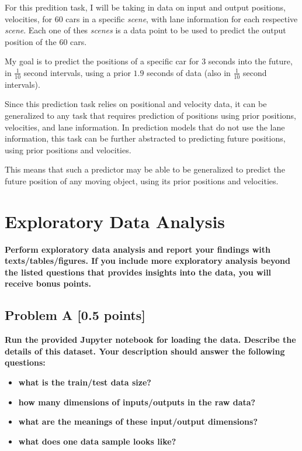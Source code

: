 \documentclass{article}
\begin{document}
      For this predition task, I will be taking in data on input and output positions, velocities, for $60$ cars in 
      a specific \emph{scene}, with lane information for each respective \emph{scene}. Each one of thes \emph{scenes}
      is a data point to be used to predict the output position of the 60 cars.

      My goal is to predict the positions of a specific car for 3 seconds into the future, in $\frac{1}{10}$ second intervals,
      using a prior $1.9$ seconds of data (also in $\frac{1}{10}$ second intervals).

      Since this prediction task relies on positional and velocity data, it can be generalized to any task that requires
      prediction of positions using prior positions, velocities, and lane information. In prediction models that do not use the 
      lane information, this task can be further abstracted to predicting future positions, using prior positions and velocities.

      This means that such a predictor may be able to be generalized to predict the future position of any moving object, using its
      prior positions and velocities.
        
  \section{Exploratory Data Analysis}
    \textbf{Perform exploratory data analysis and report your findings with texts/tables/figures. If
    you include more exploratory analysis beyond the listed questions that provides insights
    into the data, you will receive bonus points.}

    

    \subsection{Problem A [0.5 points]}
      \textbf{Run the provided Jupyter notebook for loading the data. Describe the details of this dataset. Your description
      should answer the following questions:}

      \begin{itemize}
        \item \textbf{what is the train/test data size?}
        \item \textbf{how many dimensions of inputs/outputs in the raw data?}
        \item \textbf{what are the meanings of these input/output dimensions?}
        \item \textbf{what does one data sample looks like?}
      \end{itemize}
\end{document}
